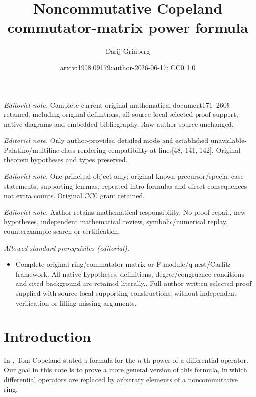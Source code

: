 \documentclass[numbers=enddot,12pt,final,onecolumn,notitlepage]{scrartcl}%
\title{Noncommutative Copeland commutator-matrix power formula}
\author{Darij Grinberg}
\date{arxiv:1908.09179:author-2026-06-17; CC0 1.0}
\theoremstyle{definition}
\begin{document}
\maketitle
\noindent\textit{Editorial note.} Complete current original mathematical document171--2609 retained, including original definitions, all source-local selected proof support, native diagrams and embedded bibliography. Raw author source unchanged.\par\medskip
\noindent\textit{Editorial note.} Only author-provided detailed mode and established unavailable-Palatino/multiline-class rendering compatibility at lines[48, 141, 142]. Original theorem hypotheses and types preserved.\par\medskip
\noindent\textit{Editorial note.} One principal object only; original known precursor/special-case statements, supporting lemmas, repeated intro formulas and direct consequences not extra counts. Original CC0 grant retained.\par\medskip
\noindent\textit{Editorial note.} Author retains mathematical responsibility. No proof repair, new hypotheses, independent mathematical review, symbolic/numerical replay, counterexample search or certification.\par\medskip
\noindent\textit{Allowed standard prerequisites (editorial).}\begin{itemize}
\item Complete original ring/commutator matrix or F-module/q-nest/Carlitz framework. All native hypotheses, definitions, degree/congruence conditions and cited background are retained literally.. Full author-written selected proof supplied with source-local supporting constructions, without independent verification or filling missing arguments.
\end{itemize}\medskip
\section{Introduction}

In \cite{MO337766}, Tom Copeland stated a formula for the $n$-th power of a
differential operator. Our goal in this note is to prove a more general
version of this formula, in which differential operators are replaced by
arbitrary elements of a noncommutative ring.
\end{document}
